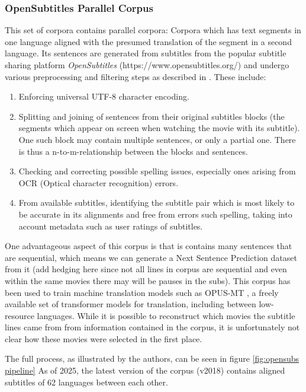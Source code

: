 \subsubsection{OpenSubtitles Parallel Corpus}
This set of corpora contains parallel corpora:
Corpora which has text segments in one language aligned with the presumed translation of the segment in a second language.
Its sentences are generated from subtitles from the popular subtitle sharing platform \textit{OpenSubtitles} (https://www.opensubtitles.org/) and undergo various preprocessing and filtering steps as described in \cite{lisonOpensubtitles2016ExtractingLarge2016}.
These include:
\begin{enumerate}
	\item Enforcing universal UTF-8 character encoding.
	\item
	      Splitting and joining of sentences from their original subtitles blocks (the segments which appear on screen when watching the movie with its subtitle).
	      One such block may contain multiple sentences, or only a partial one.
	      There is thus a n-to-m-relationship between the blocks and sentences.
	\item Checking and correcting possible spelling issues, especially ones arising from OCR (Optical character recognition) errors.
	\item From available subtitles, identifying the subtitle pair which is most likely to be accurate in its alignments and free from errors such spelling, taking into account metadata such as user ratings of subtitles.

\end{enumerate}
One advantageous aspect of this corpus is that is contains many sentences that are sequential, which means we can generate a Next Sentence Prediction dataset from it (add hedging here since not all lines in corpus are sequential and even within the same movies there may will be pauses in the subs).
This corpus has been used to train machine translation models such as OPUS-MT \cite{tiedemannOPUSMTbuildingOpenTranslation2020}, a freely available set of transformer models for translation, including between low-resource languages. 
While it is possible to reconstruct which movies the subtitle lines came from from information contained in the corpus, it is unfortunately not clear how these movies were selected in the first place.


The full process, as illustrated by the authors, can be seen in figure \ref{fig:opensubs pipeline}
As of 2025, the latest version of the corpus (v2018) contains aligned subtitles of 62 languages between each other.

